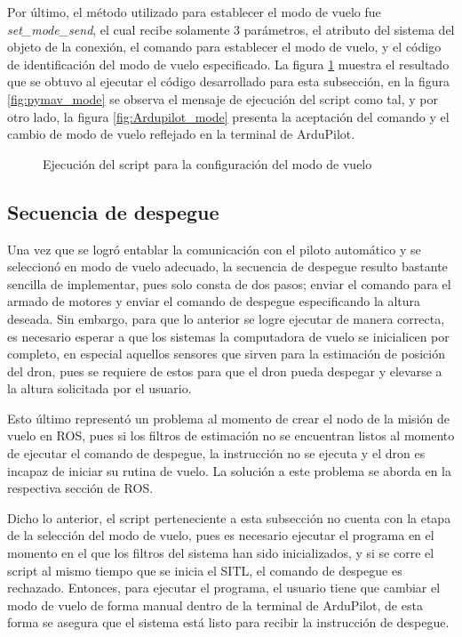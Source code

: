 Por último, el método utilizado para establecer el modo de vuelo fue \textit{set\_mode\_send}, el cual recibe solamente 3 parámetros, el atributo del sistema del objeto de la conexión, el comando para establecer el modo de vuelo, y el código de identificación del modo de vuelo especificado. La figura \ref{fig:pymav_modes} muestra el resultado que se obtuvo al ejecutar el código desarrollado para esta subsección, en la figura \ref{fig:pymav_mode} se observa el mensaje de ejecución del script como tal, y por otro lado, la figura \ref{fig:Ardupilot_mode} presenta la aceptación del comando y el cambio de modo de vuelo reflejado en la terminal de ArduPilot.


\begin{figure}[ht]
    \centering
    \hfill
    \caption{Ejecución del script para la configuración del modo de vuelo}
    \label{fig:pymav_modes}
\end{figure}


\subsection{Secuencia de despegue}

Una vez que se logró entablar la comunicación con el piloto automático y se seleccionó en modo de vuelo adecuado, la secuencia de despegue resulto bastante sencilla de implementar, pues solo consta de dos pasos; enviar el comando para el armado de motores y enviar el comando de despegue especificando la altura deseada. Sin embargo, para que lo anterior se logre ejecutar de manera correcta, es necesario esperar a que los sistemas la computadora de vuelo se inicialicen por completo, en especial aquellos sensores que sirven para la estimación de posición del dron, pues se requiere de estos para que el dron pueda despegar y elevarse a la altura solicitada por el usuario.

Esto último representó un problema al momento de crear el nodo de la misión de vuelo en ROS, pues si los filtros de estimación no se encuentran listos al momento de ejecutar el comando de despegue, la instrucción no se ejecuta y el dron es incapaz de iniciar su rutina de vuelo. La solución a este problema se aborda en la respectiva sección de ROS.

Dicho lo anterior, el script perteneciente a esta subsección no cuenta con la etapa de la selección del modo de vuelo, pues es necesario ejecutar el programa en el momento en el que los filtros del sistema han sido inicializados, y si se corre el script al mismo tiempo que  se inicia el SITL, el comando de despegue es rechazado. Entonces, para ejecutar el programa, el usuario tiene que cambiar el modo de vuelo de forma manual dentro de la terminal de ArduPilot, de esta forma se asegura que el sistema está listo para recibir la instrucción de despegue.

